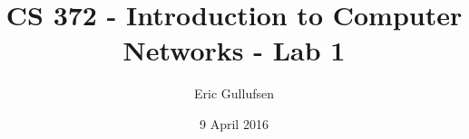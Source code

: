 \documentclass[12pt]{article}
\begin{document}
\title{CS 372 - Introduction to Computer Networks - Lab 1}
\author{Eric Gullufsen}
\date{9 April 2016}
\maketitle
\end{document}
